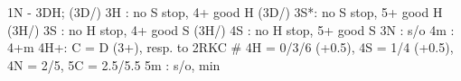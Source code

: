 1N - 3DH;
(3D/) 3H : no S stop, 4+ good H
(3D/) 3S*: no S stop, 5+ good H
(3H/) 3S : no H stop, 4+ good S
(3H/) 4S : no H stop, 5+ good S
3N : s/o
4m : 4+m
4H+: C = D (3+), resp. to 2RKC  
# 4H = 0/3/6 (+0.5), 4S = 1/4 (+0.5), 4N = 2/5, 5C = 2.5/5.5
5m : s/o, min